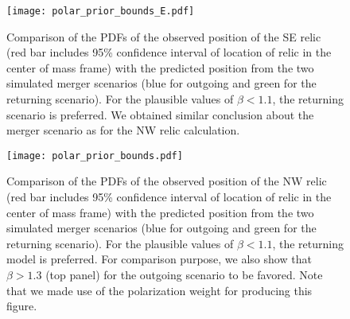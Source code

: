 \documentclass[ucdthesis.tex]{subfiles}
\begin{document}
    \begin{figure}
			\begin{center}
			\texttt{[image: polar\_prior\_bounds\_E.pdf]}
				\caption{Comparison of the PDFs of the observed position of the SE relic (red bar
					includes 95\% confidence interval of location of relic in the center of
					mass frame) with the predicted position from the two simulated merger scenarios (blue for outgoing and green for the returning scenario). 
				For the plausible values of $\beta < 1.1$, the returning scenario is preferred. 
				We obtained similar conclusion about the merger scenario as for the NW
				relic calculation.
				\label{fig:positionprior_SE}}
		\end{center}
    \end{figure}
    
    \begin{figure}
			\begin{center}
    	\texttt{[image: polar\_prior\_bounds.pdf]}
    	\caption{Comparison of the PDFs of the observed position of the NW relic (red bar
    		includes 95\% confidence interval of location of relic in the center of
    		mass frame) with the	predicted position from the two simulated merger scenarios (blue for outgoing and green for the returning scenario). 
    	For the plausible values of $\beta  < 1.1$, the returning model is
    	preferred. For comparison purpose, we also show that $\beta > 1.3$ (top
    	panel) for the outgoing scenario to be favored.  
    	Note that we made use of the polarization weight for producing this figure. 
    	\label{fig:positionprior}}
		\end{center}
    \end{figure}
    \clearpage
\end{document}
